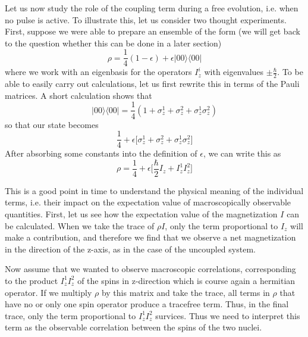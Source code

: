 \documentclass[a4paper, draft]{article}
\theoremstyle{own}
\theoremstyle{remark}
\begin{document}
Let us now study the role of the coupling term during a free evolution, i.e. when no pulse is active. To illustrate this, let us consider two thought experiments. First, suppose we were able to prepare an ensemble of the form (we will get back to the question whether this can be done in a later section)
$$
\rho = \frac{1}{4} (1 - \epsilon) + \epsilon |00 \rangle \langle 00 |
$$
where we work with an eigenbasis for the operators $I_z^i$ with eigenvalues $\pm \frac{\hbar}{2}$.  
To be able to easily carry out calculations, let us first rewrite this in terms of the Pauli matrices. A short calculation shows that
$$
|00 \rangle \langle 00 | = \frac{1}{4} (1 + \sigma_z^1 + \sigma_z^2 +  \sigma_z^1 \sigma_z^2)
$$
so that our state becomes
$$
\frac{1}{4} + \epsilon \big[ \sigma_z^1 + \sigma_z^2 + \sigma_z^1 \sigma_z^2 \big] 
$$
After absorbing some constants into the definition of $\epsilon$, we can write this as
$$
\rho = \frac{1}{4} + \epsilon \big[  \frac{\hbar}{2} I_z + I_z^1 I_z^2    \big]
$$

This is a good point in time to understand the physical meaning of the individual terms, i.e. their impact on the expectation value of macroscopically observable quantities. First, let us see how the expectation value of the magnetization $I$ can be calculated. When we take the trace of $\rho I$, only the term proportional to $I_z$ will make a contribution, and therefore we find that we observe a net magnetization in the direction of the z-axis, as in the case of the uncoupled system. 

Now assume that we wanted to observe macroscopic correlations, corresponding to the product $I_z^1 I_z^2$ of the spins in z-direction which is course again a hermitian operator. If we multiply $\rho$ by this matrix and take the trace, all terms in $\rho$ that have no or only one spin operator produce a tracefree term. Thus, in the final trace, only the term proportional to $I_z^1 I_z^2$ survices. Thus we need to interpret this term as the observable correlation between the spins of the two nuclei. 
\end{document}
